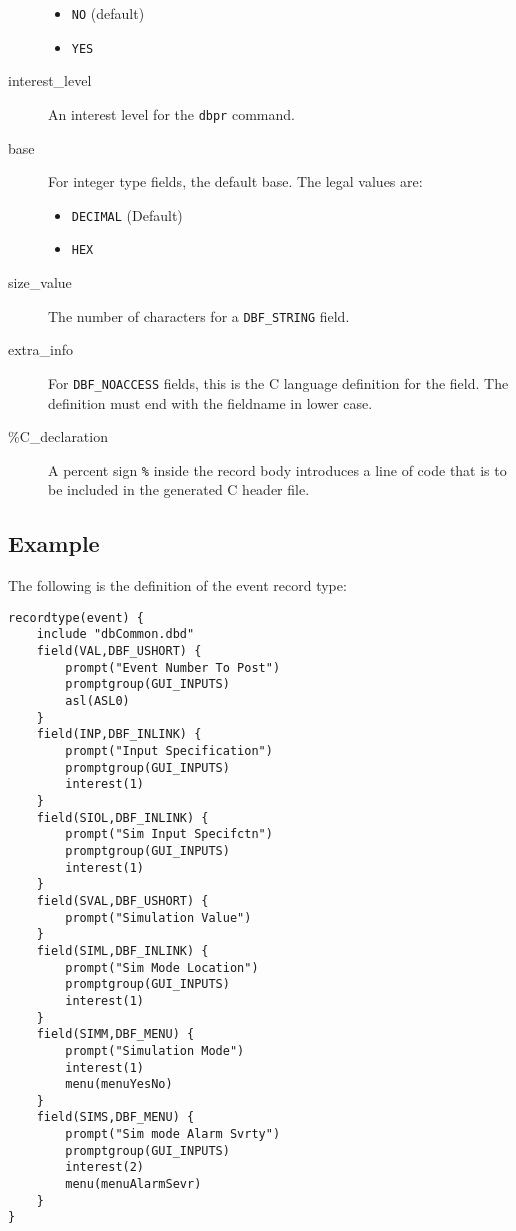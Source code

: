 \begin{description}
\begin{itemize}
\item \verb|NO| (default)
\item \verb|YES|
\end{itemize}

\item [interest\_level] An interest level for the \verb|dbpr| command.

\item [base] For integer type fields, the default base.
The legal values are:

\begin{itemize}
\item \verb|DECIMAL| (Default)
\item \verb|HEX|
\end{itemize}

\item [size\_value] The number of characters for a \verb|DBF_STRING| field.

\item [extra\_info] For \verb|DBF_NOACCESS| fields, this is the C language definition for the field.
The definition must end with the fieldname in lower case.

\item [\%C\_declaration] A percent sign \verb|%| inside the record body introduces a line of code that is to be included in the generated C header file.
\end{description}

\subsection{Example}

The following is the definition of the event record type:

\begin{verbatim}
recordtype(event) {
    include "dbCommon.dbd" 
    field(VAL,DBF_USHORT) {
        prompt("Event Number To Post")
        promptgroup(GUI_INPUTS)
        asl(ASL0)
    }
    field(INP,DBF_INLINK) {
        prompt("Input Specification")
        promptgroup(GUI_INPUTS)
        interest(1)
    }
    field(SIOL,DBF_INLINK) {
        prompt("Sim Input Specifctn")
        promptgroup(GUI_INPUTS)
        interest(1)
    }
    field(SVAL,DBF_USHORT) {
        prompt("Simulation Value")
    }
    field(SIML,DBF_INLINK) {
        prompt("Sim Mode Location")
        promptgroup(GUI_INPUTS)
        interest(1)
    }
    field(SIMM,DBF_MENU) {
        prompt("Simulation Mode")
        interest(1)
        menu(menuYesNo)
    }
    field(SIMS,DBF_MENU) {
        prompt("Sim mode Alarm Svrty")
        promptgroup(GUI_INPUTS)
        interest(2)
        menu(menuAlarmSevr)
    }
}
\end{verbatim}

